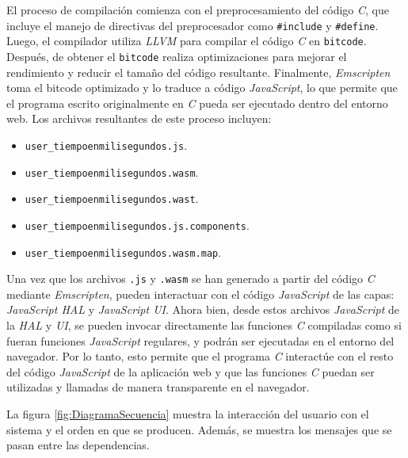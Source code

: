 El proceso de compilación comienza con el preprocesamiento del código \textit{C}, que incluye el manejo de directivas del preprocesador como \texttt{\#include} y \texttt{\#define}. Luego, el compilador utiliza \textit{LLVM} para compilar el código \textit{C} en \texttt{bitcode}. Después, de obtener el \texttt{bitcode} realiza optimizaciones para mejorar el rendimiento y reducir el tamaño del código resultante. Finalmente, \textit{Emscripten} toma el bitcode optimizado y lo traduce a código \textit{JavaScript}, lo que permite que el programa escrito originalmente en \textit{C} pueda ser ejecutado dentro del entorno web. Los archivos resultantes de este proceso incluyen: 


\begin{itemize}
	\item \texttt{user\_tiempoenmilisegundos.js}.
	\item \texttt{user\_tiempoenmilisegundos.wasm}.
	\item \texttt{user\_tiempoenmilisegundos.wast}.
	\item \texttt{user\_tiempoenmilisegundos.js.components}.
	\item \texttt{user\_tiempoenmilisegundos.wasm.map}.
\end{itemize}

Una vez que los archivos \texttt{.js} y \texttt{.wasm} se han generado a partir del código \textit{C}  mediante \textit{Emscripten}, pueden interactuar con el código \textit{JavaScript} de las capas: \textit{JavaScript HAL} y \textit{JavaScript UI}. Ahora bien, desde estos archivos \textit{JavaScript} de la \textit{HAL} y \textit{UI}, se pueden invocar directamente las funciones \textit{C} compiladas como si fueran funciones \textit{JavaScript} regulares, y podrán ser ejecutadas en el entorno del navegador. Por lo tanto, esto permite que el programa \textit{C} interactúe con el resto del código \textit{JavaScript} de la aplicación web y que las funciones \textit{C} puedan ser utilizadas y llamadas de manera transparente en el navegador.


La figura \ref{fig:DiagramaSecuencia} muestra la interacción del usuario con el sistema y el orden en que se producen. Además, se muestra los mensajes que se pasan entre las dependencias.


